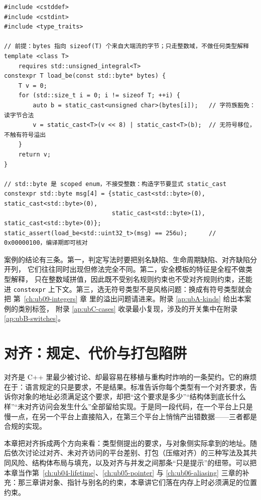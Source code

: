 \documentclass[12pt,a4paper,fontset=fandol]{ctexbook}
\newcommand{\Tp}[1]{\texttt{#1}}
\begin{document}
\begin{lstlisting}[style=cppstyle, caption={编译期可用的安全读取模板（只用合法路径）}]
#include <cstddef>
#include <cstdint>
#include <type_traits>

// 前提：bytes 指向 sizeof(T) 个来自大端流的字节；只走整数域，不做任何类型解释
template <class T>
    requires std::unsigned_integral<T>
constexpr T load_be(const std::byte* bytes) {
    T v = 0;
    for (std::size_t i = 0; i != sizeof T; ++i) {
        auto b = static_cast<unsigned char>(bytes[i]);   // 字符族豁免：读字节合法
        v = static_cast<T>(v << 8) | static_cast<T>(b);  // 无符号移位，不触有符号溢出
    }
    return v;
}

// std::byte 是 scoped enum，不接受整数：构造字节要显式 static_cast
constexpr std::byte msg[4] = {static_cast<std::byte>(0), static_cast<std::byte>(0),
                              static_cast<std::byte>(1), static_cast<std::byte>(0)};
static_assert(load_be<std::uint32_t>(msg) == 256u);      // 0x00000100，编译期即可核对
\end{lstlisting}

案例的结论有三条。第一，判定写法时要把别名缺陷、生命周期缺陷、对齐缺陷分开列，
它们往往同时出现但修法完全不同。第二，安全模板的特征是全程不做类型解释，
只在整数域拼值，因此既不受别名规则约束也不受对齐规则约束，还能进
\Tp{constexpr} 上下文。第三，选无符号类型不是风格问题：换成有符号类型就会把
第~\ref{ch:ub09-integers} 章 里的溢出问题请进来。附录 \ref{ap:ubA-kinds} 给出本案例的类别标签，
附录 \ref{ap:ubC-cases} 收录最小复现，涉及的开关集中在附录 \ref{ap:ubB-switches}。

\chapter{对齐：规定、代价与打包陷阱}\label{ch:ub07-alignment}

对齐是 C++ 里最少被讨论、却最容易在移植与重构时炸响的一条契约。它的麻烦在于：语言规定的只是要求，不是结果。标准告诉你每个类型有一个对齐要求，告诉你对象的地址必须满足这个要求，却把“这个要求是多少”“结构体到底长什么样”“未对齐访问会发生什么”全部留给实现。于是同一段代码，在一个平台上只是慢一点，在另一个平台上直接陷入，在第三个平台上悄悄产出错数据——三者都是合规的实现。

本章把对齐拆成两个方向来看：类型侧提出的要求，与对象侧实际拿到的地址。随后依次讨论过对齐、未对齐访问的平台差别、打包（压缩对齐）的三种写法及其共同风险、结构体布局与填充，以及对齐与并发之间那条“只是提示”的纽带。可以把本章当作第~\ref{ch:ub04-lifetime}、\ref{ch:ub05-pointer} 与 \ref{ch:ub06-aliasing} 三章的补充：那三章讲对象、指针与别名的约束，本章讲它们落在内存上时必须满足的位置约束。
\end{document}
